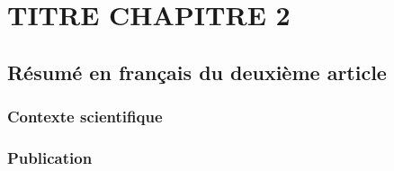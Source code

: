 \chapter{TITRE CHAPITRE 2}
\label{chap2}

\section{Résumé en français du deuxième article}

\subsection{Contexte scientifique}

\subsection{Publication}
